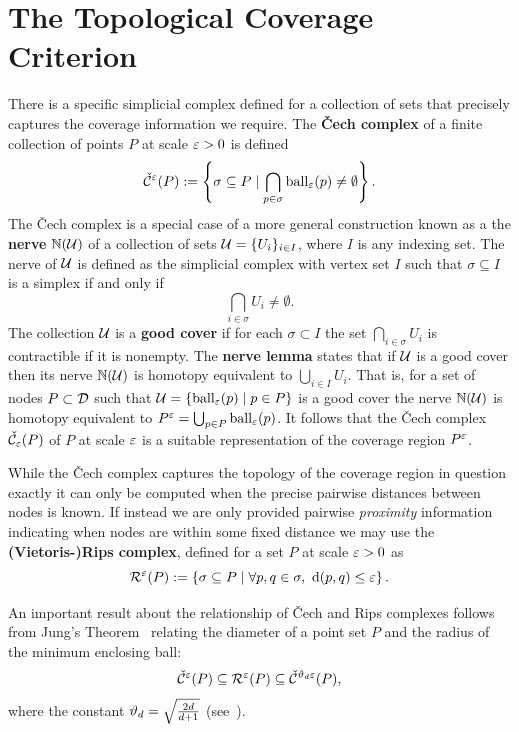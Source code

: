 \section{The Topological Coverage Criterion} %
\label{sec:tcc}

There is a specific simplicial complex defined for a collection of sets that precisely captures the coverage information we require.
The \textbf{\v Cech complex} of a finite collection of points $P$ at scale $\varepsilon > 0$ is defined
\[ \check{\mathcal{C}}^\varepsilon(P) := \left\{\sigma \subseteq P\mid \bigcap_{p\in \sigma}\mathrm{ball}_\varepsilon(p)\neq \emptyset \right\}. \]
The \v Cech complex is a special case of a more general construction known as a the \textbf{nerve} $\mathbb{N}({\mathcal{U}})$ of a collection of sets ${\mathcal{U}} = \{U_i\}_{i\in I}$, where $I$ is any indexing set.
The nerve of ${\mathcal{U}}$ is defined as the simplicial complex with vertex set $I$ such that $\sigma\subseteq I$ is a simplex if and only if \[\bigcap_{i\in \sigma} U_i\neq \emptyset.\]
The collection ${\mathcal{U}}$ is a \textbf{good cover} if for each $\sigma\subset I$ the set $\bigcap_{i\in\sigma} U_i$ is contractible if it is nonempty.
The \textbf{nerve lemma} states that if ${\mathcal{U}}$ is a good cover then its nerve $\mathbb{N}({\mathcal{U}})$ is homotopy equivalent to $\bigcup_{i\in I} U_i$.
That is, for a set of nodes $P\subset{\mathcal{D}}$ such that ${\mathcal{U}} = \{\mathrm{ball}_\varepsilon(p)\mid p\in P\}$ is a good cover the nerve $\mathbb{N}({\mathcal{U}})$ is homotopy equivalent to $P^\varepsilon = \bigcup_{p\in P} \mathrm{ball}_\varepsilon(p)$.
It follows that the \v Cech complex $\check{\mathcal{C}}_\varepsilon(P)$ of $P$ at scale $\varepsilon$ is a suitable representation of the coverage region $P^\varepsilon$.


While the \v Cech complex captures the topology of the coverage region in question exactly it can only be computed when the precise pairwise distances between nodes is known.
If instead we are only provided pairwise \textit{proximity} information indicating when nodes are within some fixed distance we may use the \textbf{(Vietoris-)Rips complex}, defined for a set $P$ at scale $\varepsilon > 0$ as
\[ \mathcal{R}^\varepsilon(P) := \left\{\sigma \subseteq P\mid \forall p,q\in\sigma,\ \mathrm{d}(p, q)\leq\varepsilon\right\}. \]

An important result about the relationship of \v Cech and Rips complexes follows from Jung's Theorem~\cite{jung01uber} relating the diameter of a point set $P$ and the radius of the minimum enclosing ball:
\begin{equation}\label{eq:jung_inclusion}
  \check{\mathcal{C}}^\varepsilon(P) \subseteq \mathcal{R}^\varepsilon(P) \subseteq \check{\mathcal{C}}^{\vartheta_d \varepsilon}(P),
\end{equation}
where the constant $\vartheta_d = \sqrt{\frac{2d}{d+1}}$ (see~\cite{buchet15efficient}).

